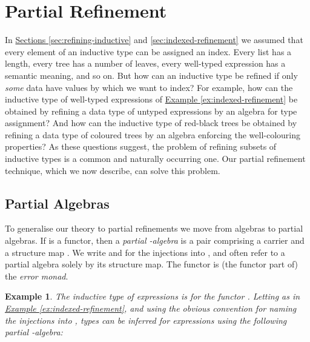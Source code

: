 \documentclass{LMCS}
\newtheorem{eorollary}{Example}
\begin{document}
\section{Partial Refinement}\label{sec:partial-refinement}

In \hyperref[sec:refining-inductive]{Sections
  \ref*{sec:refining-inductive}} and
\hyperref[sec:indexed-refinement]{ \ref*{sec:indexed-refinement}} we
assumed that every element of an inductive type can be assigned an
index. Every list has a length, every tree has a number of leaves,
every well-typed expression has a semantic meaning, and so on. But how
can an inductive type be refined if only {\em some} data have values
by which we want to index?  For example, how can the inductive type of
well-typed expressions of \hyperref[ex:indexed-refinement]{Example
  \ref*{ex:indexed-refinement}} be obtained by refining a data type of
untyped expressions by an algebra for type assignment? And how can the
inductive type of red-black trees be obtained by refining a data type
of coloured trees by an algebra enforcing the well-colouring
properties? As these questions suggest, the problem of refining
subsets of inductive types is a common and naturally occurring
one. Our partial refinement technique, which we now describe, can
solve this problem.

\subsection{Partial Algebras}

To generalise our theory to partial refinements we move from algebras
to partial algebras. If  is a functor, then a {\em partial
  -algebra} is a pair  comprising a
carrier  and a structure map . We write
 and  for the injections into ,
and often refer to a partial algebra solely by its structure map. The
functor  is (the functor part of) the {\em error monad}.

\begin{eorollary} The inductive type of expressions is  for the functor .  Letting
   as in
  \hyperref[ex:indexed-refinement]{Example
    \ref*{ex:indexed-refinement}}, and using the obvious convention
  for naming the injections into , types can be
  inferred for expressions using the following partial
  -algebra:

\end{eorollary}
\end{document}

